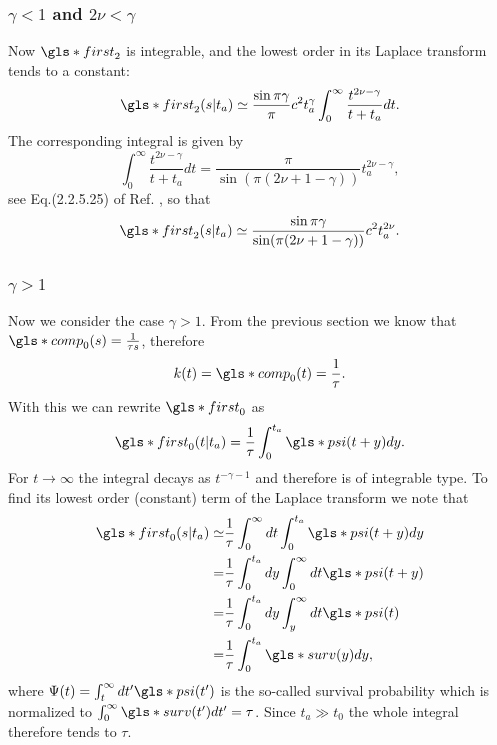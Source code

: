 \subsubsection{$\gamma <1$  and $2\nu < \gamma $} 
Now $\gls*{first}_2$ is integrable, and the lowest order in its Laplace transform tends to a constant:
\begin{equation}
 \gls*{first}_2(s|t_a) \simeq \frac{\sin \pi \gamma}{\pi}  c^2 t_a^\gamma \int_0^\infty \frac{ t^{2\nu-\gamma}}{t+t_a} dt.
\end{equation}
The corresponding integral is given by
\begin{equation}
 \int_0^\infty \frac{t^{2\nu-\gamma}}{t+t_a} dt = \frac{\pi }{\sin (\pi(2\nu +1- \gamma))}t_a^{2\nu - \gamma} ,
\end{equation}
see Eq.(2.2.5.25) of Ref. \cite{BryPr}, so that
\begin{equation}
 \gls*{first}_2(s|t_a) \simeq   \frac{\sin \pi \gamma}{\sin (\pi(2\nu +1- \gamma))}c^2 t_a^{2\nu}.
\end{equation}

\subsubsection{$\gamma > 1$}
Now we consider the case $\gamma > 1$. From the previous section we know that $\gls*{comp}_0(s)=\frac{1}{\tau s}$, therefore
\begin{equation}
k(t) =\gls*{comp}_0(t)= \frac{1}{\tau} . \label{eqn:kGammaLarge}
\end{equation}
With this we can rewrite $\gls*{first}_0$ as 
\begin{equation}
 \gls*{first}_0(t|t_a) = \frac{1}{\tau} \int_0^{t_a} \gls*{psi}(t+y)dy.
\end{equation}
For $t \to \infty$ the integral decays as $t^{-\gamma-1}$ and therefore is of integrable type. To find its lowest order (constant) term of the Laplace transform we note that
\begin{align}
 \gls*{first}_0(s|t_a) \simeq & \frac{1}{\tau} \int_0^\infty dt \int_0^{t_a} \gls*{psi}(t+y)dy \\
 =& \frac{1}{\tau} \int_0^{t_a} dy \int_0^\infty dt \gls*{psi}(t+y)  \\
 =& \frac{1}{\tau} \int_0^{t_a} dy \int_y^\infty dt \gls*{psi}(t) \\
 =& \frac{1}{\tau} \int^{t_a}_0 \gls*{surv}(y) dy,
\end{align}
where $\Psi(t) = \int_t^\infty dt' \gls*{psi}(t')$ is the so-called survival probability which is normalized to $\int_0^\infty \gls*{surv}(t') dt' = \tau$. Since $t_a \gg t_0$ the whole integral therefore tends to $\tau$. 

